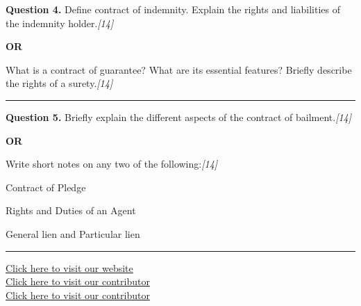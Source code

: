 \documentclass[11pt,a4paper]{article}
\newcommand{\pts}[1]{\hfill   \textit{[#1]}}
\begin{document}
\noindent   \textbf{Question 4.}
Define contract of indemnity. Explain the rights and liabilities of the indemnity holder.\pts{14}

\centerline{   \textbf{OR}}

What is a contract of guarantee? What are its essential features? Briefly describe the rights of a surety.\pts{14}

\medskip\rule{\linewidth}{0.2pt}




\noindent   \textbf{Question 5.}
Briefly explain the different aspects of the contract of bailment.\pts{14}

\centerline{   \textbf{OR}}

Write short notes on any two of the following:\pts{14}

\begin{parts}
  \item Contract of Pledge
  \item Rights and Duties of an Agent
  \item General lien and Particular lien
\end{parts}

\vfill
\rule{\linewidth}{0.4pt}

\begin{center}\small
\href{https://bhu-exam.vercel.app/}{Click here to visit our website}\\[4pt]
\href{https://me-aryan.vercel.app/}{Click here to visit our contributor}\\[4pt]
\href{https://quashan-me.vercel.app/}{Click here to visit our contributor}
\end{center}
\end{document}
